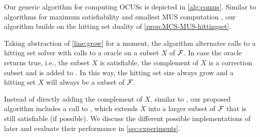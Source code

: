 %
Our generic algorithm for computing OCUSs is depicted in \cref{alg:comus}.  
Similar to algorithms for maximum satisfiability \cite{davies} and smallest MUS computation \cite{ignatiev2015smallest}, our algorithm builds on the hitting set duality of \cref{prop:MCS-MUS-hittingset}.

Taking abstraction of \cref{line:grow} for a moment, 
the algorithm alternates calls to a hitting set solver with calls to a \sat oracle on a subset $X$ of $\mathcal{F} $. 
In case the \sat oracle returns true, i.e., the subset $X$ is satisfiable, the complement of $X$ is a correction subset and is added to \setstohit. In this way, the hitting set size always grow and a hitting set $X$ will always be a subset of $\mathcal{F} $.

Instead of directly adding the complement of $X$, similar to \cite{ignatiev2015smallest}, our proposed algorithm includes a call to \grow, which extends $X$ into a larger subset of $\mathcal{F} $ that is still satisfiable (if possible).
 
We discuss the different possible implementations of \grow later and evaluate their performance in \cref{sec:experiments}. 

